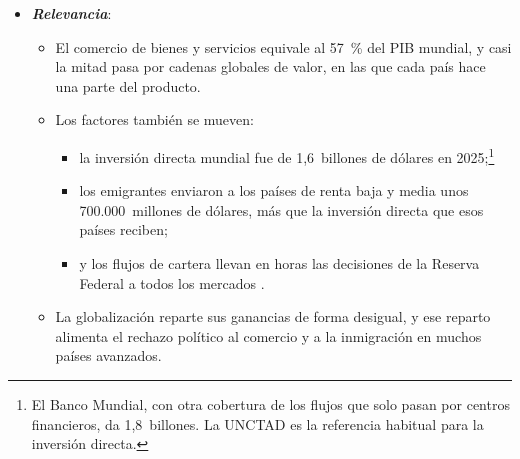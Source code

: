 \documentclass[11pt]{article}
\begin{document}
\begin{itemize}
\item \textbf{\emph{Relevancia}}:
  \begin{itemize}
  \item El comercio de bienes y servicios equivale al 57~\% del PIB mundial\nocite{BancoMundial2026Apertura}, y casi la mitad pasa por cadenas globales de valor, en las que cada país hace una parte del producto\nocite{BM2020WDR}.
  \item Los factores también se mueven:
    \begin{itemize}
    \item la inversión directa mundial fue de 1,6~billones de dólares en 2025\nocite{UNCTAD2026WIR};\footnote{El Banco Mundial, con otra cobertura de los flujos que solo pasan por centros financieros, da 1,8~billones\nocite{BM2026WDIIED}. La UNCTAD es la referencia habitual para la inversión directa.}
    \item los emigrantes enviaron a los países de renta baja y media unos 700.000~millones de dólares, más que la inversión directa que esos países reciben\nocite{BM2026WDIRemesas,FIDA2026Remesas};
    \item y los flujos de cartera llevan en horas las decisiones de la Reserva Federal a todos los mercados .
    \end{itemize}
  \item La globalización reparte sus ganancias de forma desigual, y ese reparto alimenta el rechazo político al comercio y a la inmigración en muchos países avanzados\nocite{Rodrik2011Paradox}.
  \end{itemize}


\end{itemize}
\end{document}
